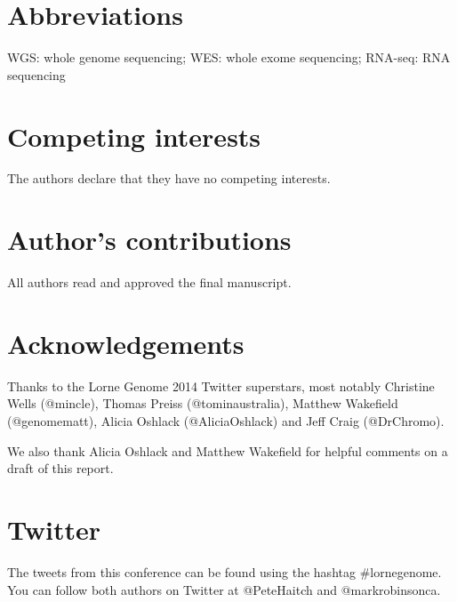 \documentclass[twocolumn]{bmcart}%
\begin{document}
\begin{backmatter}

\section*{Abbreviations}
WGS: whole genome sequencing; WES: whole exome sequencing; RNA-seq: RNA sequencing

\section*{Competing interests}
  The authors declare that they have no competing interests.

\section*{Author's contributions}
All authors read and approved the final manuscript.

\section*{Acknowledgements}
Thanks to the Lorne Genome 2014 Twitter superstars, most notably Christine Wells (@mincle), Thomas Preiss (@tominaustralia), Matthew Wakefield (@genomematt), Alicia Oshlack (@AliciaOshlack) and Jeff Craig (@DrChromo).
 
We also thank Alicia Oshlack and Matthew Wakefield for helpful comments on a draft of this report.

\section*{Twitter}
The tweets from this conference can be found using the hashtag \#lornegenome. You can follow both authors on Twitter at @PeteHaitch and @markrobinsonca.





\end{backmatter}
\end{document}

